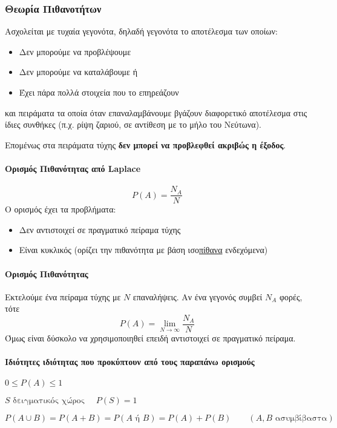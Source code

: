 \documentclass[11pt,a4paper,notitlepage,fleqn,final]{article}
\begin{document}
    \subsubsection{Θεωρία Πιθανοτήτων}
    Ασχολείται με τυχαία γεγονότα, δηλαδή γεγονότα το αποτέλεσμα
    των οποίων:
    \begin{itemize}
    	\item Δεν μπορούμε να προβλέψουμε
    	\item Δεν μπορούμε να καταλάβουμε ή
    	\item Έχει πάρα πολλά στοιχεία που το επηρεάζουν
    \end{itemize}
    και πειράματα τα οποία όταν επαναλαμβάνουμε βγάζουν
    διαφορετικό αποτέλεσμα στις ίδιες συνθήκες (π.χ. ρίψη
    ζαριού, σε αντίθεση με το μήλο του Νεύτωνα).
    
    Επομένως στα πειράματα τύχης \textbf{δεν μπορεί να
    προβλεφθεί ακριβώς η έξοδος}.

	\paragraph{Ορισμός Πιθανότητας από Laplace}
	\[
	P(A) = \frac{N_A}{N}
	\]
	Ο ορισμός έχει τα προβλήματα:
	\begin{itemize}
		\item Δεν αντιστοιχεί σε πραγματικό πείραμα τύχης
		\item Είναι κυκλικός (ορίζει την πιθανότητα με βάση
		ισο\underline{πίθανα} ενδεχόμενα)
	\end{itemize}
	\paragraph{Ορισμός Πιθανότητας %
	}
	Εκτελούμε ένα πείραμα τύχης με \(N\) επαναλήψεις. Αν ένα
	γεγονός συμβεί \(N_A\) φορές, τότε
	\[
	P(A) = \lim_{N\to  \infty } \frac{N_A}{N}
	\]
	Όμως είναι δύσκολο να χρησιμοποιηθεί επειδή αντιστοιχεί σε
	πραγματικό πείραμα.
	\paragraph{Ιδιότητες ιδιότητας που προκύπτουν από
		τους παραπάνω ορισμούς}
	\begin{enumroman}
		\item \( 0 \leq P(A) \leq 1 \)
		\item \( S \text{ δειγματικός χώρος } \quad 
		P(S) = 1 \)
		\item \( P(A\cup B) = P(A+B) = P(A \text{ ή } B)
		= P(A) + P(B) \qquad (A,B \text{ ασυμβίβαστα})
		 \)
	\end{enumroman}
	
\end{document}
